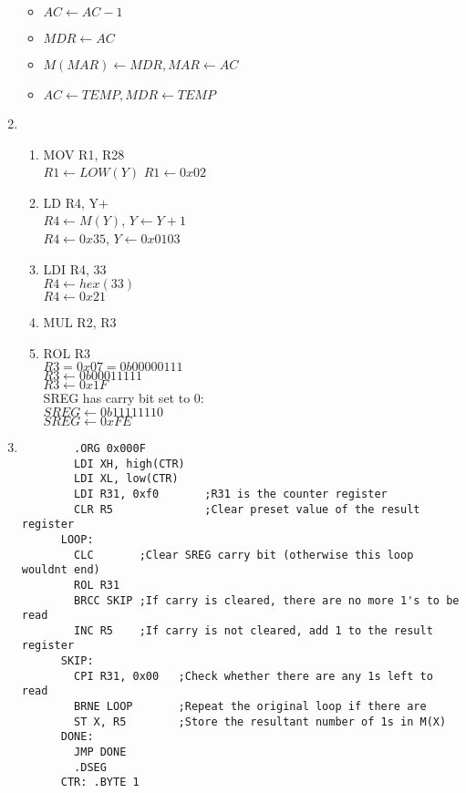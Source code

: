 \documentclass{article}
\begin{document}
\begin{enumerate}
\begin{itemize}
        \item $AC \leftarrow AC - 1$
        \item $MDR \leftarrow AC$
        \item $M(MAR) \leftarrow MDR, MAR \leftarrow AC$
        \item $AC \leftarrow TEMP, MDR \leftarrow TEMP$
        \end{itemize}
      \item\begin{enumerate}[label=(\roman*)]
        \item MOV R1, R28\\
          $R1 \leftarrow LOW(Y)$
          $R1 \leftarrow 0x02$
        \item LD  R4, Y+\\
          $R4 \leftarrow M(Y)$, $Y \leftarrow Y + 1$\\
          $R4 \leftarrow 0x35$, $Y \leftarrow 0x0103$
        \item LDI R4, 33\\
          $R4 \leftarrow hex(33)$\\
          $R4 \leftarrow 0x21$\\
        \item MUL R2, R3
        \item ROL R3\\
          $R3 = 0x07 = 0b00000111$\\
          $R3 \leftarrow 0b0001 1111$\\
          $R3 \leftarrow 0x1F$\\

          SREG has carry bit set to 0:\\
          $SREG \leftarrow 0b1111 1110$\\
          $SREG \leftarrow 0xFE$\\

        \end{enumerate}
      \item\begin{verbatim}
        .ORG 0x000F
        LDI XH, high(CTR)
        LDI XL, low(CTR)
        LDI R31, 0xf0       ;R31 is the counter register
        CLR R5              ;Clear preset value of the result register
      LOOP:   
        CLC       ;Clear SREG carry bit (otherwise this loop wouldnt end)
        ROL R31             
        BRCC SKIP ;If carry is cleared, there are no more 1's to be read
        INC R5    ;If carry is not cleared, add 1 to the result register
      SKIP:   
        CPI R31, 0x00   ;Check whether there are any 1s left to read
        BRNE LOOP       ;Repeat the original loop if there are
        ST X, R5        ;Store the resultant number of 1s in M(X)
      DONE:   
        JMP DONE
        .DSEG
      CTR: .BYTE 1  
        \end{verbatim}


\end{enumerate}
\end{document}
